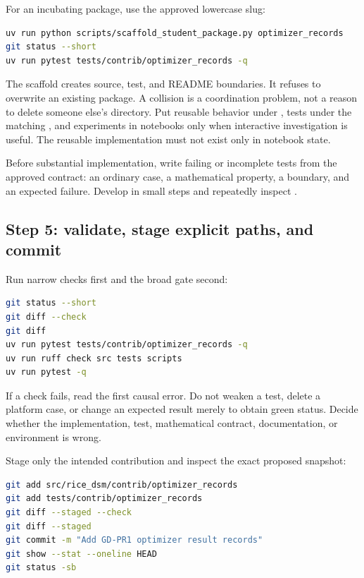 For an incubating package, use the approved lowercase slug:

\begin{lstlisting}[language=bash,numbers=none]
uv run python scripts/scaffold_student_package.py optimizer_records
git status --short
uv run pytest tests/contrib/optimizer_records -q
\end{lstlisting}

The scaffold creates source, test, and README boundaries. It refuses to
overwrite an existing package. A collision is a coordination problem, not a
reason to delete someone else's directory. Put reusable behavior under
, tests under the matching
, and experiments in notebooks only
when interactive investigation is useful. The reusable implementation must not
exist only in notebook state.

Before substantial implementation, write failing or incomplete tests from the
approved contract: an ordinary case, a mathematical property, a boundary, and
an expected failure. Develop in small steps and repeatedly inspect
.

\subsection*{Step 5: validate, stage explicit paths, and commit}

Run narrow checks first and the broad gate second:

\begin{lstlisting}[language=bash,numbers=none]
git status --short
git diff --check
git diff
uv run pytest tests/contrib/optimizer_records -q
uv run ruff check src tests scripts
uv run pytest -q
\end{lstlisting}

If a check fails, read the first causal error. Do not weaken a test, delete a
platform case, or change an expected result merely to obtain green status.
Decide whether the implementation, test, mathematical contract, documentation,
or environment is wrong.

Stage only the intended contribution and inspect the exact proposed snapshot:

\begin{lstlisting}[language=bash,numbers=none]
git add src/rice_dsm/contrib/optimizer_records
git add tests/contrib/optimizer_records
git diff --staged --check
git diff --staged
git commit -m "Add GD-PR1 optimizer result records"
git show --stat --oneline HEAD
git status -sb
\end{lstlisting}


